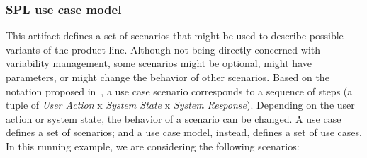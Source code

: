 \documentclass{acm_proc_article-sp}
\begin{document}
\subsubsection{SPL use case model} 

This artifact defines a set of scenarios that might be used to describe possible variants of the product line. Although not being directly concerned 
with variability management, some scenarios might be optional, might have parameters, or might change the behavior of other 
scenarios. Based on the notation proposed in~\cite{gcabral-sbmf-2006},  a use case scenario corresponds to a sequence of
steps (a tuple of \emph{User Action} x \emph{System State} x \emph{System Response}). Depending on the user action or system state, 
the behavior of a scenario can be changed. A use case defines a set of scenarios; and a use case model, instead, defines a set of use cases.
In this running example, we are considering the following scenarios:
\end{document}
